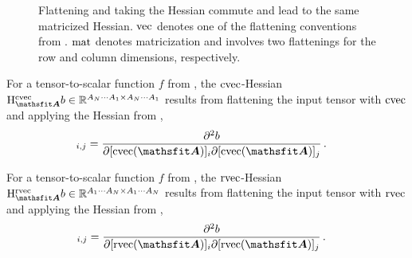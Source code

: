 \begin{figure}[!h]
  \centering
  \caption{Flattening and taking the Hessian commute and lead to the same matricized Hessian.
    $\vec$ denotes one of the flattening conventions from .
    $\mat$ denotes matricization and involves two flattenings for the row and column dimensions, respectively.}
\end{figure}


\begin{definition}\label{def:cvec_hessian}
  For a tensor-to-scalar function $f$ from , the $\cvec$-Hessian $\hess_{\tA}^{\cvec}b \in \sR^{A_N \cdots A_1 \times A_N \cdots A_1}$ results from flattening the input tensor with $\cvec$ and applying the Hessian from ,
  \begin{align*}
    [\hess^{\cvec}_{\tA}b]_{i, j}
     & =
    \frac{\partial^2 b}{\partial [\cvec(\tA)]_{i} \partial [\cvec(\tA)]_{j}}\,.
  \end{align*}
\end{definition}

\begin{definition}\label{def:rvec_hessian}
  For a tensor-to-scalar function $f$ from , the $\rvec$-Hessian $\hess_{\tA}^{\rvec}b \in \sR^{A_1 \cdots A_N \times A_1 \cdots A_N}$ results from flattening the input tensor with $\rvec$ and applying the Hessian from ,
  \begin{align*}
    [\hess^{\rvec}_{\tA}b]_{i, j}
     & =
    \frac{\partial^2 b}{\partial [\rvec(\tA)]_{i} \partial [\rvec(\tA)]_{j}}\,.
  \end{align*}
\end{definition}

